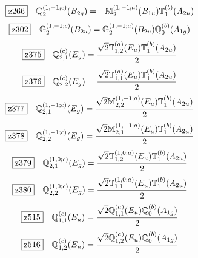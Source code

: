 \documentclass[fleqn,10pt,landscape]{jsarticle}
\begin{document}
\begin{dmath*}
\hspace*{3mm}\fbox{z266}\quad \mathbb{Q}_{2}^{(1,-1;c)}(B_{2g})=- \mathbb{M}_{2}^{(1,-1;a)}(B_{1u}) \mathbb{T}_{1}^{(b)}(A_{2u})
\end{dmath*}
\begin{dmath*}
\hspace*{3mm}\fbox{z302}\quad \mathbb{G}_{2}^{(1,-1;c)}(B_{2u})=\mathbb{G}_{2}^{(1,-1;a)}(B_{2u}) \mathbb{Q}_{0}^{(b)}(A_{1g})
\end{dmath*}
\begin{dmath*}
\hspace*{3mm}\fbox{z375}\quad \mathbb{Q}_{2,1}^{(c)}(E_{g})=\frac{\sqrt{2} \mathbb{T}_{1,2}^{(a)}(E_{u}) \mathbb{T}_{1}^{(b)}(A_{2u})}{2}
\end{dmath*}
\begin{dmath*}
\hspace*{3mm}\fbox{z376}\quad \mathbb{Q}_{2,2}^{(c)}(E_{g})=\frac{\sqrt{2} \mathbb{T}_{1,1}^{(a)}(E_{u}) \mathbb{T}_{1}^{(b)}(A_{2u})}{2}
\end{dmath*}
\begin{dmath*}
\hspace*{3mm}\fbox{z377}\quad \mathbb{Q}_{2,1}^{(1,-1;c)}(E_{g})=\frac{\sqrt{2} \mathbb{M}_{2,2}^{(1,-1;a)}(E_{u}) \mathbb{T}_{1}^{(b)}(A_{2u})}{2}
\end{dmath*}
\begin{dmath*}
\hspace*{3mm}\fbox{z378}\quad \mathbb{Q}_{2,2}^{(1,-1;c)}(E_{g})=\frac{\sqrt{2} \mathbb{M}_{2,1}^{(1,-1;a)}(E_{u}) \mathbb{T}_{1}^{(b)}(A_{2u})}{2}
\end{dmath*}
\begin{dmath*}
\hspace*{3mm}\fbox{z379}\quad \mathbb{Q}_{2,1}^{(1,0;c)}(E_{g})=\frac{\sqrt{2} \mathbb{T}_{1,2}^{(1,0;a)}(E_{u}) \mathbb{T}_{1}^{(b)}(A_{2u})}{2}
\end{dmath*}
\begin{dmath*}
\hspace*{3mm}\fbox{z380}\quad \mathbb{Q}_{2,2}^{(1,0;c)}(E_{g})=\frac{\sqrt{2} \mathbb{T}_{1,1}^{(1,0;a)}(E_{u}) \mathbb{T}_{1}^{(b)}(A_{2u})}{2}
\end{dmath*}
\begin{dmath*}
\hspace*{3mm}\fbox{z515}\quad \mathbb{Q}_{1,1}^{(c)}(E_{u})=\frac{\sqrt{2} \mathbb{Q}_{1,1}^{(a)}(E_{u}) \mathbb{Q}_{0}^{(b)}(A_{1g})}{2}
\end{dmath*}
\begin{dmath*}
\hspace*{3mm}\fbox{z516}\quad \mathbb{Q}_{1,2}^{(c)}(E_{u})=\frac{\sqrt{2} \mathbb{Q}_{1,2}^{(a)}(E_{u}) \mathbb{Q}_{0}^{(b)}(A_{1g})}{2}
\end{dmath*}
\end{document}
